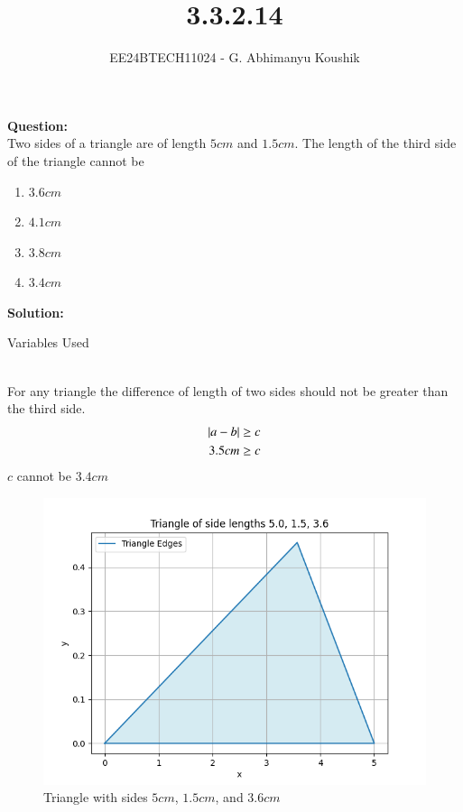 \documentclass[journal]{IEEEtran}
\begin{document}

\vspace{3cm}

\title{3.3.2.14}
\author{EE24BTECH11024 - G. Abhimanyu Koushik
}
{\let\newpage\relax\maketitle}

\renewcommand{\thefigure}{\theenumi}
\renewcommand{\thetable}{\theenumi}
\setlength{\intextsep}{10pt} %

\textbf{Question:}\\
Two sides of a triangle are of length $5cm$ and $1.5cm$. The length of the third side of the triangle cannot be
\\
\begin{enumerate}[label=\alph*.]
	\item $3.6cm$
	\item $4.1cm$
	\item $3.8cm$
	\item $3.4cm$
\end{enumerate}
\textbf{Solution:}
\begin{table}[h!]    
  \centering
  
  \caption{Variables Used}
  \label{tab10.5.3.9.1}
\end{table}\\
For any triangle the difference of length of two sides should not be greater than the third side. 
\begin{align}
	\left\vert a-b\right\vert \geq c\\
	3.5cm \geq c
\end{align}
$c$ cannot be $3.4cm$
\begin{figure}[h!]
   \centering
   \includegraphics[width=0.7\linewidth]{figs/fig1.png}
   \caption{Triangle with sides $5cm$, $1.5cm$, and $3.6cm$}
\end{figure}
\end{document}
